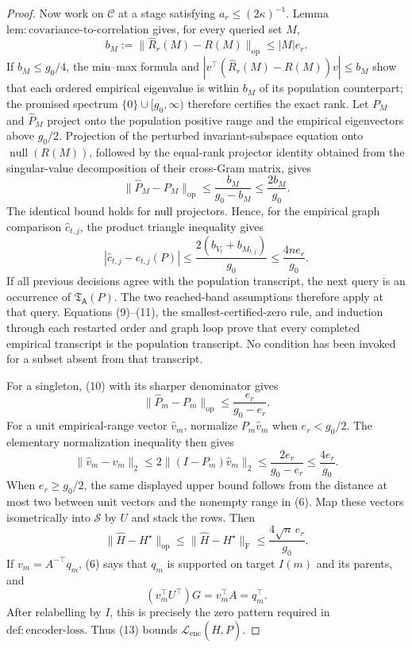 \documentclass{article}
\begin{document}
\begin{proof}
Now work on \(\mathcal C\) at a stage satisfying \(a_r\le(2\kappa)^{-1}\).  Lemma \(\mathrm{lem{:}covariance\mbox{-}to\mbox{-}correlation}\) gives, for every queried set \(M\),
\[
 b_M:=\|\widehat R_r(M)-R(M)\|_{\mathrm{op}}\le |M|e_r.
 \tag{9}
\]
If \(b_M\le g_0/4\), the min--max formula and \(|v^{\top}(\widehat R_r(M)-R(M))v|\le b_M\) show that each ordered empirical eigenvalue is within \(b_M\) of its population counterpart; the promised spectrum \(\{0\}\cup[g_0,\infty)\) therefore certifies the exact rank.  Let \(P_M\) and \(\widehat P_M\) project onto the population positive range and the empirical eigenvectors above \(g_0/2\).  Projection of the perturbed invariant-subspace equation onto \(\operatorname{null}(R(M))\), followed by the equal-rank projector identity obtained from the singular-value decomposition of their cross-Gram matrix, gives
\[
 \|\widehat P_M-P_M\|_{\mathrm{op}}
 \le\frac{b_M}{g_0-b_M}\le\frac{2b_M}{g_0}.
 \tag{10}
\]
The identical bound holds for null projectors.  Hence, for the empirical graph comparison \(\widehat c_{t,j}\), the product triangle inequality gives
\[
 |\widehat c_{t,j}-c_{t,j}(P)|
 \le\frac{2(b_{V_t}+b_{M_{t,j}})}{g_0}
 \le\frac{4ne_r}{g_0}.
 \tag{11}
\]
If all previous decisions agree with the population transcript, the next query is an occurrence of \(\mathfrak T_{\mathsf A}(P)\).  The two reached-band assumptions therefore apply at that query.  Equations (9)--(11), the smallest-certified-zero rule, and induction through each restarted order and graph loop prove that every completed empirical transcript is the population transcript.  No condition has been invoked for a subset absent from that transcript.

For a singleton, (10) with its sharper denominator gives
\[
 \|\widehat P_m-P_m\|_{\mathrm{op}}
 \le\frac{e_r}{g_0-e_r}.
\]
For a unit empirical-range vector \(\widehat v_m\), normalize \(P_m\widehat v_m\) when \(e_r<g_0/2\).  The elementary normalization inequality then gives
\[
 \|\widehat v_m-v_m\|_2
 \le2\|(I-P_m)\widehat v_m\|_2
 \le\frac{2e_r}{g_0-e_r}\le\frac{4e_r}{g_0}.
 \tag{12}
\]
When \(e_r\ge g_0/2\), the same displayed upper bound follows from the distance at most two between unit vectors and the nonempty range in (6).  Map these vectors isometrically into \(\mathcal S\) by \(U\) and stack the rows.  Then
\[
 \|\widehat H-H^{\star}\|_{\mathrm{op}}
 \le\|\widehat H-H^{\star}\|_{\mathrm F}
 \le\frac{4\sqrt n\,e_r}{g_0}.
 \tag{13}
\]
If \(v_m=A^{-\top}q_m\), (6) says that \(q_m\) is supported on target \(I(m)\) and its parents, and
\[
 (v_m^{\top}U^{\top})G=v_m^{\top}A=q_m^{\top}.
\]
After relabelling by \(I\), this is precisely the zero pattern required in \(\mathrm{def{:}encoder\mbox{-}loss}\).  Thus (13) bounds \(\mathcal L_{\mathrm{enc}}(\widehat H,P)\).


\end{proof}
\end{document}
